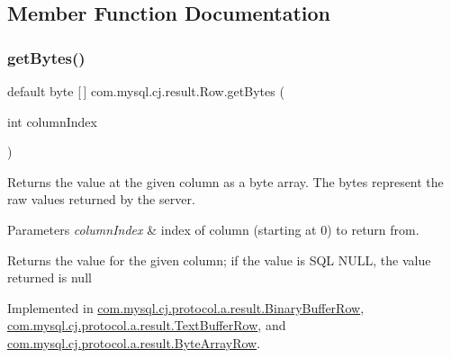 \subsection{Member Function Documentation}
\mbox{\label{interfacecom_1_1mysql_1_1cj_1_1result_1_1_row_a063918cd10fe7c3ef5df95b33e21f19e}} 
\subsubsection{\texorpdfstring{get\+Bytes()}{getBytes()}}
{\footnotesize\ttfamily default byte \mbox{[}$\,$\mbox{]} com.\+mysql.\+cj.\+result.\+Row.\+get\+Bytes (\begin{DoxyParamCaption}\item[{int}]{column\+Index }\end{DoxyParamCaption})}

Returns the value at the given column as a byte array. The bytes represent the raw values returned by the server.


\begin{DoxyParams}{Parameters}
{\em column\+Index} & index of column (starting at 0) to return from. \\
\hline
\end{DoxyParams}
\begin{DoxyReturn}{Returns}
the value for the given column; if the value is S\+QL {\ttfamily N\+U\+LL}, the value returned is {\ttfamily null} 
\end{DoxyReturn}


Implemented in \mbox{\hyperlink{classcom_1_1mysql_1_1cj_1_1protocol_1_1a_1_1result_1_1_binary_buffer_row_a2d51fe0441a52cbc0d93b23a5c1c0364}{com.\+mysql.\+cj.\+protocol.\+a.\+result.\+Binary\+Buffer\+Row}}, \mbox{\hyperlink{classcom_1_1mysql_1_1cj_1_1protocol_1_1a_1_1result_1_1_text_buffer_row_a54253c1dda65ca0c96dc3ca1adf4b908}{com.\+mysql.\+cj.\+protocol.\+a.\+result.\+Text\+Buffer\+Row}}, and \mbox{\hyperlink{classcom_1_1mysql_1_1cj_1_1protocol_1_1a_1_1result_1_1_byte_array_row_a51fcdd0efd6909d54dc395077c800768}{com.\+mysql.\+cj.\+protocol.\+a.\+result.\+Byte\+Array\+Row}}.

\mbox{\label{interfacecom_1_1mysql_1_1cj_1_1result_1_1_row_aaf07357d53c30067dfa87183a1e60a18}} 

